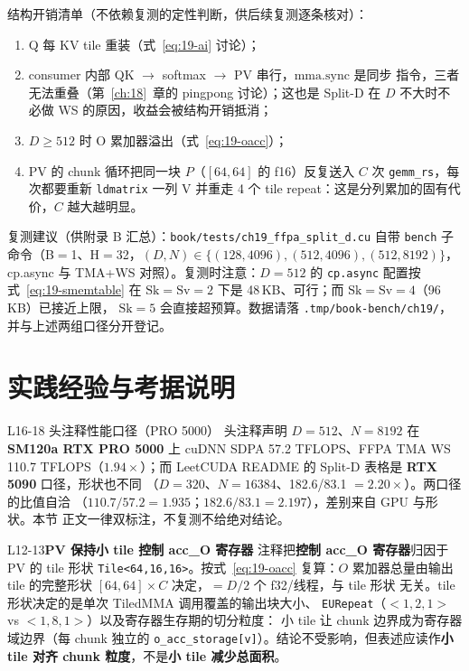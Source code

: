 结构开销清单（不依赖复测的定性判断，供后续复测逐条核对）：

\begin{enumerate}[itemsep=2pt,topsep=2pt]
  \item Q 每 KV tile 重装（式~\ref{eq:19-ai} 讨论）；
  \item consumer 内部 QK $\to$ softmax $\to$ PV 串行，$\mathrm{mma.sync}$ 是同步
        指令，三者无法重叠（第~\ref{ch:18}~章的 pingpong 讨论）；这也是 Split-D
        在 $D$ 不大时不必做 WS 的原因，收益会被结构开销抵消；
  \item $D \ge 512$ 时 O 累加器溢出（式~\ref{eq:19-oacc}）；
  \item PV 的 chunk 循环把同一块 $P$（$[64,64]$ 的 f16）反复送入 $C$ 次
        \texttt{gemm\_rs}，每次都要重新 \texttt{ldmatrix} 一列 V 并重走 4 个
        tile repeat：这是分列累加的固有代价，$C$ 越大越明显。
\end{enumerate}

复测建议（供附录 B 汇总）：\texttt{book/\allowbreak{}tests/\allowbreak{}ch19\_\allowbreak{}ffpa\_\allowbreak{}split\_\allowbreak{}d.cu} 自带
\texttt{bench} 子命令（B$=$1、H$=$32，$(D,N) \in \{(128,4096), (512,4096),
(512,8192)\}$，cp.async 与 TMA+WS 对照）。复测时注意：$D{=}512$ 的
\texttt{cp.async} 配置按式~\ref{eq:19-smemtable} 在 $\mathrm{Sk}{=}\mathrm{Sv}{=}2$
下是 48\,KB、可行；而 $\mathrm{Sk}{=}\mathrm{Sv}{=}4$（96\,KB）已接近上限，
$\mathrm{Sk}{=}5$ 会直接超预算。数据请落
\texttt{.\allowbreak{}tmp/\allowbreak{}book-bench/\allowbreak{}ch19/\allowbreak{}}，并与上述两组口径分开登记。

\section{实践经验与考据说明}

\begin{kaogu}[F4·口径差异]{L16-18 头注释性能口径（PRO 5000）}
  头注释声明 $D{=}512$、$N{=}8192$ 在 \textbf{SM120a RTX PRO 5000} 上
  cuDNN SDPA 57.2 TFLOPS、FFPA TMA WS 110.7 TFLOPS（$1.94\times$）；而 LeetCUDA
  README 的 Split-D 表格是 \textbf{RTX 5090} 口径，形状也不同
  （$D{=}320$、$N{=}16384$、182.6/83.1 $=2.20\times$）。两口径的比值自洽
  （$110.7/57.2 = 1.935$；$182.6/83.1 = 2.197$），差别来自 GPU 与形状。本节
  正文一律双标注，不复测不给绝对结论。
\end{kaogu}

\begin{kaogu}[F1/F3·表述澄清]{L12-13\textbf{PV 保持小 tile 控制 acc\_O 寄存器}}
  注释把\textbf{控制 acc\_O 寄存器}归因于 PV 的 tile 形状
  \texttt{Tile\allowbreak{}<64,\allowbreak{}16,\allowbreak{}16>}。按式~\ref{eq:19-oacc} 复算：$O$ 累加器总量由输出
  tile 的完整形状 $[64,64] \times C$ 决定，$= D/2$ 个 f32/线程，与 tile 形状
  无关。tile 形状决定的是单次 TiledMMA 调用覆盖的输出块大小、
  \texttt{EURepeat}（$<1,2,1>$ vs $<1,8,1>$）以及寄存器生存期的切分粒度：
  小 tile 让 chunk 边界成为寄存器域边界（每 chunk 独立的
  \texttt{o\_\allowbreak{}acc\_\allowbreak{}storage[v]}）。结论不受影响，但表述应读作\textbf{小 tile 对齐 chunk
  粒度}，不是\textbf{小 tile 减少总面积}。
\end{kaogu}

